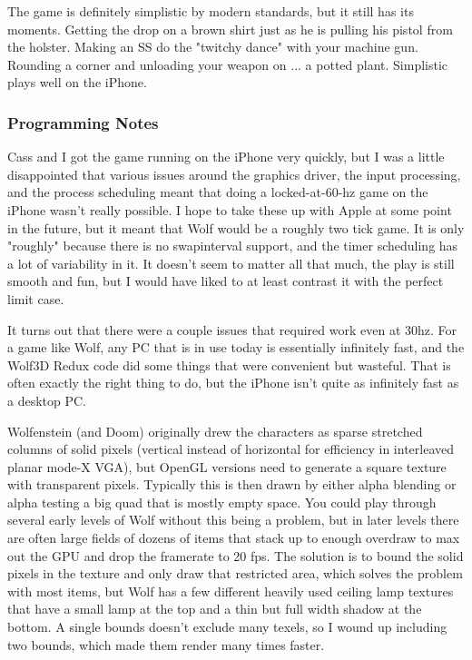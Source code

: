 \documentclass[book.tex]{subfiles}
\begin{document}
The game is definitely simplistic by modern standards, but it still has its moments.  Getting the drop on a brown shirt just as he is pulling his pistol from the holster.  Making an SS do the "twitchy dance" with your machine gun.  Rounding a corner and unloading your weapon on ... a potted plant.  Simplistic plays well on the iPhone.\\
\par

\subsubsection*{Programming Notes}
Cass and I got the game running on the iPhone very quickly, but I was a little disappointed that various issues around the graphics driver, the input processing, and the process scheduling meant that doing a locked-at-60-hz game on the iPhone wasn't really possible.  I hope to take these up with Apple at some point in the future, but it meant that Wolf would be a roughly two tick game.  It is only "roughly" because there is no swapinterval support, and the timer scheduling has a lot of variability in it.  It doesn't seem to matter all that much, the play is still smooth and fun, but I would have liked to at least contrast it with the perfect limit case.\\
\par

It turns out that there were a couple issues that required work even at 30hz.  For a game like Wolf, any PC that is in use today is essentially infinitely fast, and the Wolf3D Redux code did some things that were convenient but wasteful.  That is often exactly the right thing to do, but the iPhone isn't quite as infinitely fast as a desktop PC.\\
\par

Wolfenstein (and Doom) originally drew the characters as sparse stretched columns of solid pixels (vertical instead of horizontal for efficiency in interleaved planar mode-X VGA), but OpenGL versions need to generate a square texture with transparent pixels.  Typically this is then drawn by either alpha blending or alpha testing a big quad that is mostly empty space.  You could play through several early levels of Wolf without this being a problem, but in later levels there are often large fields of dozens of items that stack up to enough overdraw to max out the GPU and drop the framerate to 20 fps.  The solution is to bound the solid pixels in the texture and only draw that restricted area, which solves the problem with most items, but Wolf has a few different heavily used ceiling lamp textures that have a small lamp at the top and a thin but full width shadow at the bottom.  A single bounds doesn't exclude many texels, so I wound up including two bounds, which made them render many times faster.\\
\par
\end{document}

